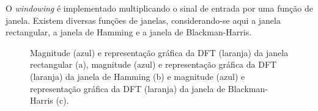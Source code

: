 \documentclass[11pt]{article}
\numberwithin{equation}{section}
\begin{document}
O \textit{windowing} é implementado multiplicando o sinal de entrada por uma função de janela. Existem diversas funções de janelas, considerando-se aqui a janela rectangular, a janela de Hamming e a janela de Blackman-Harris.

\begin{figure}[H]
	\centering
	\linebreak
	\linebreak
	\vspace{-0.8em}
	\caption{Magnitude (azul) e representação gráfica da DFT (laranja) da janela rectangular (a), magnitude (azul) e representação gráfica da DFT (laranja) da janela de Hamming (b) e  magnitude (azul) e representação gráfica da DFT (laranja) da janela de Blackman-Harris (c).}
	\vspace{-0.8em}
\end{figure}
\end{document}
